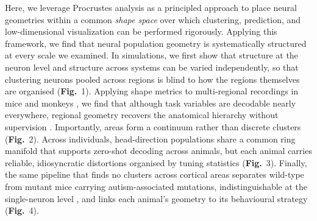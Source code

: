 Here, we leverage Procrustes analysis \parencite{Gower2004,Williams2021,pospisil2023estimating,harvey2024duality,khosla2024soft} as a principled approach to place neural geometries within a common \textit{shape space} over which clustering, prediction, and low-dimensional visualization can be performed rigorously.
Applying this framework, we find that neural population geometry is systematically structured at every scale we examined. In simulations, we first show that structure at the neuron level and structure across systems can be varied independently, so that clustering neurons pooled across regions is blind to how the regions themselves are organised (\textbf{Fig.}~1). Applying shape metrics to multi-regional recordings in mice \parencite{angelaki2025brain} and monkeys \parencite{Siegel2015-cz}, we find that although task variables are decodable nearly everywhere, regional geometry recovers the anatomical hierarchy without supervision \parencite{posani2026}. Importantly, areas form a continuum rather than discrete clusters (\textbf{Fig.}~2). Across individuals, head-direction populations share a common ring manifold that supports zero-shot decoding across animals, but each animal carries reliable, idiosyncratic distortions organised by tuning statistics (\textbf{Fig.}~3). Finally, the same pipeline that finds no clusters across cortical areas separates wild-type from mutant mice carrying autism-associated mutations, indistinguishable at the single-neuron level \parencite{noel2025}, and links each animal's geometry to its behavioural strategy (\textbf{Fig.}~4). 


